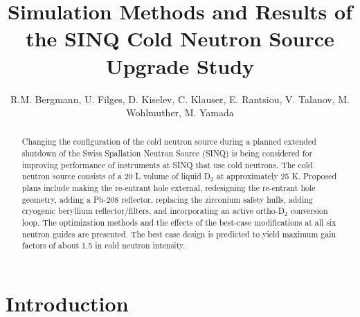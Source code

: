 \documentclass[a4paper]{jpconf}
\begin{document}
\title{Simulation Methods and Results of the SINQ Cold Neutron Source Upgrade Study } %

\author{R.M. Bergmann, U. Filges, D. Kiselev, C. Klauser, E. Rantsiou, V. Talanov, M. Wohlmuther, M. Yamada} %

\address{Paul Scherrer Institut, Villigen, Switzerland}


\begin{abstract}

\noindent Changing the configuration of the cold neutron source during a planned extended shutdown of the Swiss Spallation Neutron Source (SINQ) is being considered for improving performance of instruments at SINQ that use cold neutrons.  The cold neutron source consists of a 20 L volume of liquid D$_2$ at approximately 25 K.  Proposed plans include making the re-entrant hole external, redesigning the re-entrant hole geometry, adding a Pb-208 reflector, replacing the zirconium safety hulls, adding cryogenic beryllium reflector/filters, and incorporating an active ortho-D$_2$ conversion loop.  The optimization methods and the effects of the best-case modifications at all six neutron guides are presented.  The best case design is predicted to yield maximum gain factors of about 1.5 in cold neutron intensity.  

\end{abstract}


\section{Introduction}
\end{document}
